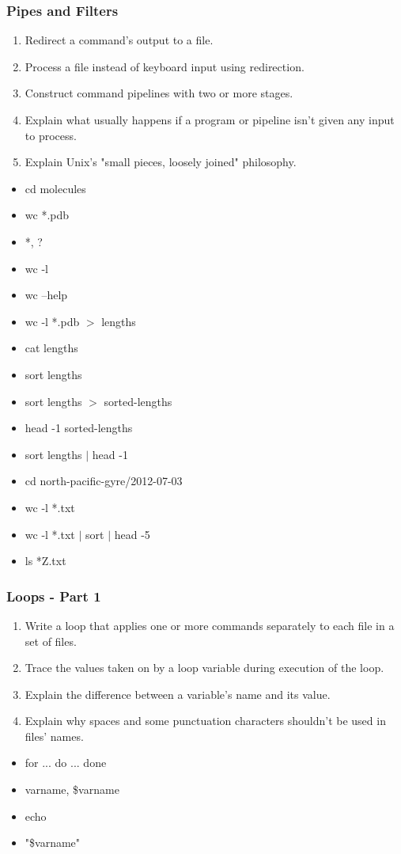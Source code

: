 \documentclass[xcolor=dvipsnames]{beamer}
\begin{document}
\begin{frame}
\frametitle{Pipes and Filters}
\begin{enumerate}

\item    Redirect a command's output to a file.
\item    Process a file instead of keyboard input using redirection.
\item    Construct command pipelines with two or more stages.
\item    Explain what usually happens if a program or pipeline isn't given any input to process.
\item    Explain Unix's "small pieces, loosely joined" philosophy.

\end{enumerate}
\begin{multicols}{2}
\begin{itemize}
\item cd molecules
\item wc *.pdb
\item *, ?
\item wc -l
\item wc --help
\item wc -l *.pdb $>$ lengths
\item cat lengths
\item sort lengths
\item sort lengths $>$ sorted-lengths
\item head -1 sorted-lengths
\item sort lengths $|$ head -1
\item cd north-pacific-gyre/2012-07-03
\item wc -l *.txt
\item wc -l *.txt $|$ sort $|$ head -5
\item ls *Z.txt
\end{itemize}
\end{multicols}
\end{frame}


\begin{frame}
\frametitle{Loops - Part 1}
\begin{enumerate}
  \item Write a loop that applies one or more commands separately to each file in a set of files.
  \item Trace the values taken on by a loop variable during execution of the loop.
  \item Explain the difference between a variable's name and its value.
  \item Explain why spaces and some punctuation characters shouldn't be used in files' names.
\end{enumerate}
\begin{multicols}{2}
\begin{itemize}
  \item for ... do ... done
  \item varname, \$varname
  \item echo
  \item "\$varname"
\end{itemize}
\end{multicols}
\end{frame}
\end{document}
